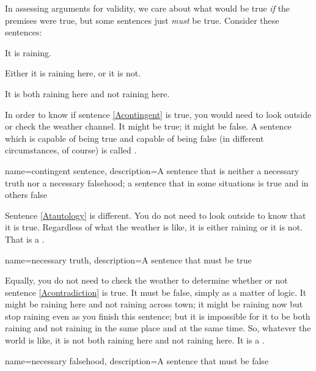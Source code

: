In assessing arguments for validity, we care about what would be true \emph{if} the premises were true, but some sentences just \emph{must} be true. Consider these sentences:
	\begin{earg}
		\item[\ex{Acontingent}] It is raining.
		\item[\ex{Atautology}] Either it is raining here, or it is not.
		\item[\ex{Acontradiction}] It is both raining here and not raining here.
	\end{earg}
In order to know if sentence \ref{Acontingent} is true, you would need to look outside or check the weather channel. It might be true; it might be false. A sentence which is capable of being true and capable of being false (in different circumstances, of course) is called .

{
name=contingent sentence,
description={A sentence that is neither a \gls{necessary truth} nor a \gls{necessary falsehood}; a sentence that in some situations is true and in others false}
}

Sentence \ref{Atautology} is different. You do not need to look outside to know that it is true. Regardless of what the weather is like, it is either raining or it is not. That is a . 

{
name={necessary truth},
description={A sentence that must be true}
}

Equally, you do not need to check the weather to determine whether or not sentence \ref{Acontradiction} is true. It must be false, simply as a matter of logic. It might be raining here and not raining across town; it might be raining now but stop raining even as you finish this sentence; but it is impossible for it to be both raining and not raining in the same place and at the same time. So, whatever the world is like, it is not both raining here and not raining here. It is a .

{
name={necessary falsehood},
description={A sentence that must be false}
}



